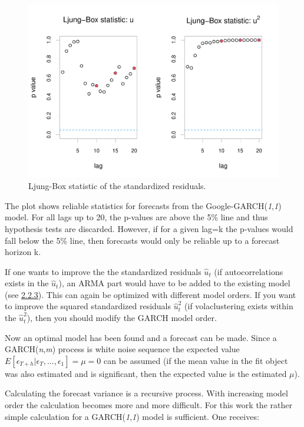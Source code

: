 \documentclass[
]{article}
\begin{document}
\begin{figure}

{\centering \includegraphics[width=0.7\linewidth]{00_main_files/figure-latex/chap2.2.2-1} 

}

\caption{Ljung-Box statistic of the standardized residuals.}\label{fig:chap2.2.2}
\end{figure}

The plot shows reliable statistics for forecasts from the
Google-GARCH(\emph{1},\emph{1}) model. For all lags up to 20, the
p-values are above the 5\% line and thus hypothesis tests are discarded.
However, if for a given lag=k the p-values would fall below the 5\%
line, then forecasts would only be reliable up to a forecast horizon k.

If one wants to improve the the standardized residuals \(\hat{u}_{t}\)
(if autocorrelations exists in the \(\hat{u}_{t}\)), an ARMA part would
have to be added to the existing model (see
\protect\hyperlink{arma-garch-section}{2.2.3}). This can again be
optimized with different model orders. If you want to improve the
squared standardized residuals \(\hat{u}^{2}_{t}\) (if volaclustering
exists within the \(\hat{u}^{2}_{t}\)), then you should modify the GARCH
model order.

Now an optimal model has been found and a forecast can be made. Since a
GARCH(\emph{n},\emph{m}) process is white noise sequence the expected
value \(E[\epsilon_{T+h} | \epsilon_{T},...,\epsilon_{1}]=\mu=0\) can be
assumed (if the mean value in the fit object was also estimated and is
significant, then the expected value is the estimated \(\mu\)).

Calculating the forecast variance is a recursive process. With
increasing model order the calculation becomes more and more difficult.
For this work the rather simple calculation for a
GARCH(\emph{1},\emph{1}) model is sufficient. One receives:
\end{document}
